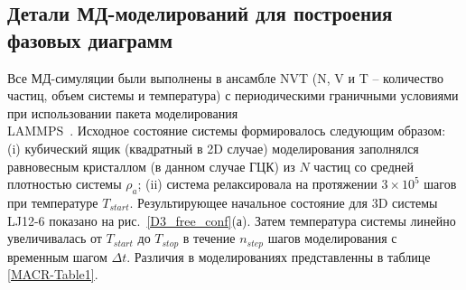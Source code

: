 \subsection{Детали МД-моделирований для построения фазовых диаграмм}
\label{PRIMe-SubSecPhaseDiagramMD}



Все МД-симуляции были выполнены в ансамбле NVT (N, V и T -- количество частиц, объем системы и температура) с периодическими граничными условиями при использовании пакета моделирования \\  LAMMPS~\cite{10.1006/jcph.1995.1039}.
Исходное состояние системы формировалось следующим образом: (i) кубический ящик (квадратный в 2D случае) моделирования заполнялся равновесным кристаллом (в данном случае ГЦК) из $N$ частиц со средней плотностью системы $\rho_a$; (ii) система релаксировала на протяжении $3 \times 10^5$ шагов при температуре $T_{start}$.
Результирующее начальное состояние для 3D системы LJ12-6 показано на рис.~\ref{D3_free_conf}(а).
Затем температура системы линейно увеличивалась от $T_{start}$ до $T_{stop}$ в течение $n_{step}$ шагов моделирования с временным шагом $\Delta t$.
Различия в моделированиях представленны в таблице \ref{MACR-Table1}.


\begin{table}[h!]
    \caption{Параметры, используемые в МД-моделировании для бимодальных расчетов:
    где $\rho$ — средняя плотность системы, $r_c$ — радиус отсечки,
    $T_{start}$ и $T_{stop}$ — начальная и конечная температуры моделирования,
    $n_{step}$ — количество шагов моделирования, а
    $\Delta t$ — временной шаг.}
    \label{MACR-Table1}
\end{table}


